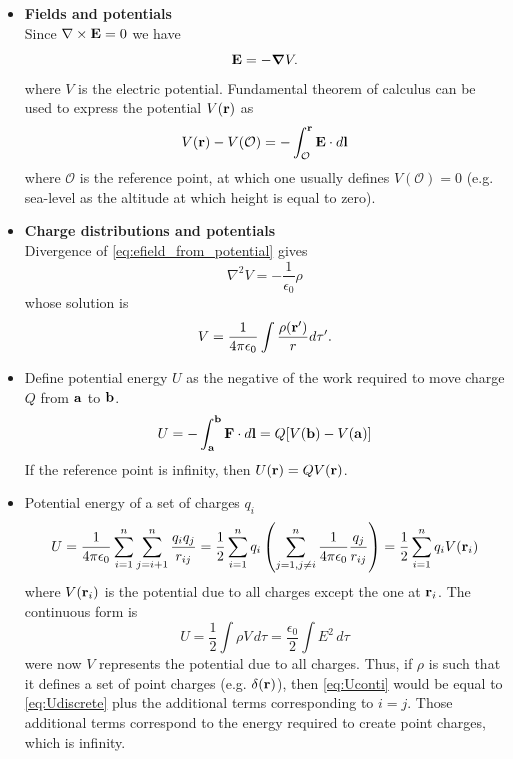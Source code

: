 \documentclass[oneside,a4paper,11pt]{report}
\begin{document}
\begin{itemize}
\item \textbf{Fields and potentials}\\
Since $\nabla \times \mathbf{E} = 0$ we have 
\begin{equation}
\label{eq:efield_from_potential}
\mathbf{E} = -\boldsymbol \nabla V.
\end{equation}
where $V$ is the electric potential. Fundamental theorem of calculus can be used to express the potential $V(\mathbf{r})$ as
\begin{equation}
V(\mathbf{r}) - V(\mathcal{O}) = -\int_\mathcal{O}^{\mathbf{r}} \mathbf{E} \cdot d\mathbf{l}
\end{equation}
where $\mathcal{O}$ is the reference point, at which one usually defines $V(\mathcal{O}) = 0$ (e.g. sea-level as the altitude at which height is equal to zero). 

\item \textbf{Charge distributions and potentials}\\
Divergence of \cref{eq:efield_from_potential} gives
\begin{equation}
\nabla^2 V = - \frac{1}{\epsilon_0} \rho
\end{equation}
whose solution is
\begin{equation}
V = \frac{1}{4 \pi \epsilon_0} \int \frac{\rho(\mathbf{r}')}{r} d\tau'.
\end{equation}

\item Define potential energy $U$ as the negative of the work required to move charge $Q$ from $\mathbf{a}$ to $\mathbf{b}$.
\begin{equation}
U = -\int_{\mathbf{a}}^{\mathbf{b}} \mathbf{F} \cdot d\mathbf{l} = Q [ V(\mathbf{b}) - V(\mathbf{a}) ]
\end{equation}
If the reference point is infinity, then $U(\mathbf{r}) = Q V(\mathbf{r})$.

\item Potential energy of a set of charges $q_i$ 
\begin{equation}
\label{eq:Udiscrete}
U = \frac{1}{4 \pi \epsilon_0} \sum^n_{i=1} \sum^n_{j = i+1} \frac{q_i q_j}{r_{ij}} = \frac{1}{2} \sum_{i=1}^{n} q_i \left ( \sum_{j = 1, j \ne i}^{n} \frac{1}{4 \pi \epsilon_0} \frac{q_j}{r_{ij}} \right ) = \frac{1}{2} \sum_{i=1}^{n} q_i V(\mathbf{r}_i)
\end{equation}
where $V(\mathbf{r}_i)$ is the potential due to all charges except the one at $\mathbf{r}_i$. The continuous form is
\begin{equation}
\label{eq:Uconti}
U = \frac{1}{2} \int \rho V \, d\tau = \frac{\epsilon_0}{2} \int E^2 \, d\tau
\end{equation}
were now $V$ represents the potential due to all charges. Thus, if $\rho$ is such that it defines a set of point charges (e.g. $\delta(\mathbf{r})$), then \cref{eq:Uconti} would be equal to \cref{eq:Udiscrete} plus the additional terms corresponding to $i=j$. Those additional terms correspond to the energy required to create point charges, which is infinity. 


\end{itemize}
\end{document}
